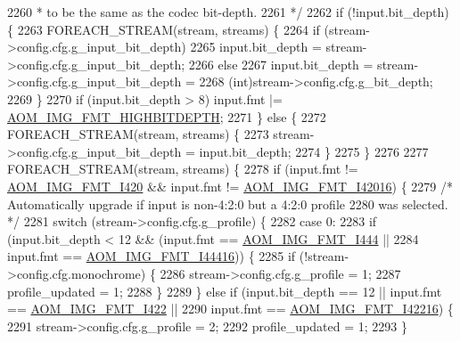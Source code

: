 \begin{DoxyCodeInclude}
{{{{{{{{{{{{{{{{{{{{{{{{{{{{{{{{{{{{{{{{{{{{{{{{{{{{{{{{{{{{{{2260 \textcolor{comment}{     * to be the same as the codec bit-depth.}
2261 \textcolor{comment}{     */}
2262     \textcolor{keywordflow}{if} (!input.bit\_depth) \{
2263       FOREACH\_STREAM(stream, streams) \{
2264         \textcolor{keywordflow}{if} (stream->config.cfg.g\_input\_bit\_depth)
2265           input.bit\_depth = stream->config.cfg.g\_input\_bit\_depth;
2266         \textcolor{keywordflow}{else}
2267           input.bit\_depth = stream->config.cfg.g\_input\_bit\_depth =
2268               (int)stream->config.cfg.g\_bit\_depth;
2269       \}
2270       \textcolor{keywordflow}{if} (input.bit\_depth > 8) input.fmt |= \hyperlink{aom__image_8h_a607b37d91f75442f54223ecd85f1b6cb}{AOM\_IMG\_FMT\_HIGHBITDEPTH};
2271     \} \textcolor{keywordflow}{else} \{
2272       FOREACH\_STREAM(stream, streams) \{
2273         stream->config.cfg.g\_input\_bit\_depth = input.bit\_depth;
2274       \}
2275     \}
2276 
2277     FOREACH\_STREAM(stream, streams) \{
2278       \textcolor{keywordflow}{if} (input.fmt != \hyperlink{aom__image_8h_a930317c04b4bd0a660bb5e744055523cabd778a3d697463e89d12a1117f417b60}{AOM\_IMG\_FMT\_I420} && input.fmt != 
      \hyperlink{aom__image_8h_a930317c04b4bd0a660bb5e744055523ca20a9cf30277260685642b4cfb4e9273b}{AOM\_IMG\_FMT\_I42016}) \{
2279         \textcolor{comment}{/* Automatically upgrade if input is non-4:2:0 but a 4:2:0 profile}
2280 \textcolor{comment}{           was selected. */}
2281         \textcolor{keywordflow}{switch} (stream->config.cfg.g\_profile) \{
2282         \textcolor{keywordflow}{case} 0:
2283           \textcolor{keywordflow}{if} (input.bit\_depth < 12 && (input.fmt == \hyperlink{aom__image_8h_a930317c04b4bd0a660bb5e744055523ca89d423506e948ab7d3b98b5750b92655}{AOM\_IMG\_FMT\_I444} ||
2284               input.fmt == \hyperlink{aom__image_8h_a930317c04b4bd0a660bb5e744055523cab9b93d397dedbdd6bfafec84d1f8f0f5}{AOM\_IMG\_FMT\_I44416})) \{
2285             \textcolor{keywordflow}{if} (!stream->config.cfg.monochrome) \{
2286               stream->config.cfg.g\_profile = 1;
2287               profile\_updated = 1;
2288             \}
2289           \} \textcolor{keywordflow}{else} \textcolor{keywordflow}{if} (input.bit\_depth == 12 || input.fmt == \hyperlink{aom__image_8h_a930317c04b4bd0a660bb5e744055523cab2f75281e94ebc0f0bc728ef287cd3e8}{AOM\_IMG\_FMT\_I422} ||
2290               input.fmt == \hyperlink{aom__image_8h_a930317c04b4bd0a660bb5e744055523ca064683ed4260fc6244af6cfc9d261c22}{AOM\_IMG\_FMT\_I42216}) \{
2291             stream->config.cfg.g\_profile = 2;
2292             profile\_updated = 1;
2293           \}
}}}}}}}}}}}}}}}}}}}}}}}}}}}}}}}}}}}}}}}}}}}}}}}}}}}}}}}}}}}}}}
\end{DoxyCodeInclude}
